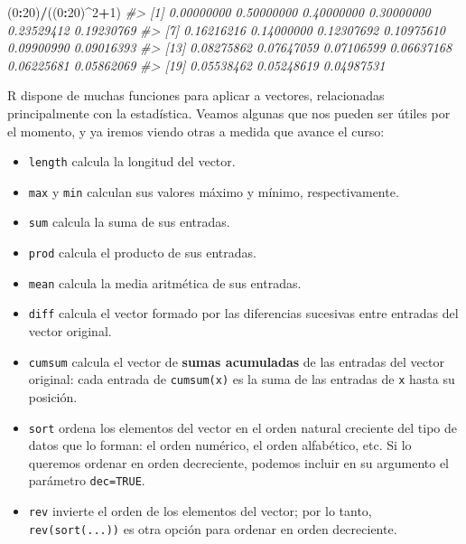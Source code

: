 \documentclass[
]{book}
\newenvironment{Shaded}{\begin{snugshade}}{\end{snugshade}}
\newcommand{\CommentTok}[1]{\textcolor[rgb]{0.56,0.35,0.01}{\textit{#1}}}
\newcommand{\DecValTok}[1]{\textcolor[rgb]{0.00,0.00,0.81}{#1}}
\newcommand{\NormalTok}[1]{#1}
\newcommand{\OperatorTok}[1]{\textcolor[rgb]{0.81,0.36,0.00}{\textbf{#1}}}
\providecommand{\tightlist}{%
  \setlength{\itemsep}{0pt}\setlength{\parskip}{0pt}}
\theoremstyle{definition}
\theoremstyle{definition}
\theoremstyle{definition}
\theoremstyle{remark}
\begin{document}
\begin{Shaded}
\begin{Highlighting}[]
\NormalTok{(}\DecValTok{0}\OperatorTok{:}\DecValTok{20}\NormalTok{)}\OperatorTok{/}\NormalTok{((}\DecValTok{0}\OperatorTok{:}\DecValTok{20}\NormalTok{)}\OperatorTok{\^{}}\DecValTok{2}\OperatorTok{+}\DecValTok{1}\NormalTok{)}
\CommentTok{\#\textgreater{}  [1] 0.00000000 0.50000000 0.40000000 0.30000000 0.23529412 0.19230769}
\CommentTok{\#\textgreater{}  [7] 0.16216216 0.14000000 0.12307692 0.10975610 0.09900990 0.09016393}
\CommentTok{\#\textgreater{} [13] 0.08275862 0.07647059 0.07106599 0.06637168 0.06225681 0.05862069}
\CommentTok{\#\textgreater{} [19] 0.05538462 0.05248619 0.04987531}
\end{Highlighting}
\end{Shaded}

R dispone de muchas funciones para aplicar a vectores, relacionadas principalmente con la estadística. Veamos algunas que nos pueden ser útiles por el momento, y ya iremos viendo otras a medida que avance el curso:

\begin{itemize}
\tightlist
\item
  \texttt{length} calcula la longitud del vector.
\item
  \texttt{max} y \texttt{min} calculan sus valores máximo y mínimo, respectivamente.
\item
  \texttt{sum} calcula la suma de sus entradas.
\item
  \texttt{prod} calcula el producto de sus entradas.
\item
  \texttt{mean} calcula la media aritmética de sus entradas.
\item
  \texttt{diff} calcula el vector formado por las diferencias sucesivas entre entradas del vector original.
\item
  \texttt{cumsum} calcula el vector de \textbf{sumas acumuladas} de las entradas del vector original: cada entrada de \texttt{cumsum(x)} es la suma de las entradas de \texttt{x} hasta su posición.
\item
  \texttt{sort} ordena los elementos del vector en el orden natural creciente del tipo de datos que lo forman: el orden numérico, el orden alfabético, etc. Si lo queremos ordenar en orden decreciente, podemos incluir en su argumento el parámetro \texttt{dec=TRUE}.
\item
  \texttt{rev} invierte el orden de los elementos del vector; por lo tanto, \texttt{rev(sort(...))} es otra opción para ordenar en orden decreciente.
\end{itemize}
\end{document}
